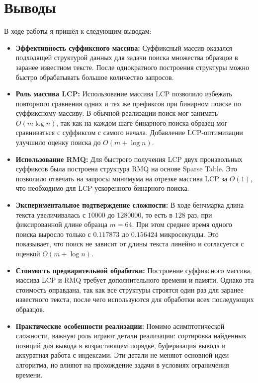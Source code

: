 \section{Выводы}

В ходе работы я пришёл к следующим выводам:
\begin{itemize}
    \item \textbf{Эффективность суффиксного массива:} Суффиксный массив оказался подходящей структурой данных для задачи поиска множества образцов в заранее известном тексте. После однократного построения структуры можно быстро обрабатывать большое количество запросов.

    \item \textbf{Роль массива LCP:} Использование массива LCP позволило избежать повторного сравнения одних и тех же префиксов при бинарном поиске по суффиксному массиву. В обычной реализации поиск мог занимать \(O(m \log n)\), так как на каждом шаге бинарного поиска образец мог сравниваться с суффиксом с самого начала. Добавление LCP-оптимизации улучшило оценку поиска до \(O(m + \log n)\).

    \item \textbf{Использование RMQ:} Для быстрого получения LCP двух произвольных суффиксов была построена структура RMQ на основе Sparse Table. Это позволило отвечать на запросы минимума на отрезке массива LCP за \(O(1)\), что необходимо для LCP-ускоренного бинарного поиска.

    \item \textbf{Экспериментальное подтверждение сложности:} В ходе бенчмарка длина текста увеличивалась с \(10000\) до \(1280000\), то есть в \(128\) раз, при фиксированной длине образца \(m = 64\). При этом среднее время одного поиска выросло только с \(0.117873\) до \(0.156424\) микросекунды. Это показывает, что поиск не зависит от длины текста линейно и согласуется с оценкой \(O(m + \log n)\).

    \item \textbf{Стоимость предварительной обработки:} Построение суффиксного массива, массива LCP и RMQ требует дополнительного времени и памяти. Однако эта стоимость оправдана, так как все структуры строятся один раз для заранее известного текста, после чего используются для обработки всех последующих образцов.

    \item \textbf{Практические особенности реализации:} Помимо асимптотической сложности, важную роль играют детали реализации: сортировка найденных позиций для вывода в возрастающем порядке, буферизация вывода и аккуратная работа с индексами. Эти детали не меняют основной идеи алгоритма, но влияют на прохождение задачи в условиях ограничения времени.
\end{itemize}

